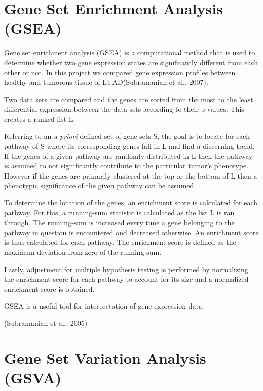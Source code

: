\documentclass[
  parskip,
  oneside]{scrreprt}
\begin{document}
\hypertarget{gene-set-enrichment-analysis-gsea}{%
\section{Gene Set Enrichment Analysis
(GSEA)}\label{gene-set-enrichment-analysis-gsea}}

Gene set enrichment analysis (GSEA) is a computational method that is
used to determine whether two gene expression states are significantly
different from each other or not. In this project we compared gene
expression profiles between healthy and tumorous tissue of
LUAD(Subramanian et al., 2007).

Two data sets are compared and the genes are sorted from the most to the
least differential expression between the data sets according to their
p-values. This creates a ranked list L.

Referring to an \emph{a priori} defined set of gene sets S, the goal is
to locate for each pathway of S where its corresponding genes fall in L
and find a discerning trend. If the genes of a given pathway are
randomly distributed in L then the pathway is assumed to not
significantly contribute to the particular tumor's phenotype. However if
the genes are primarily clustered at the top or the bottom of L then a
phenotypic significance of the given pathway can be assumed.

To determine the location of the genes, an enrichment score is
calculated for each pathway. For this, a running-sum statistic is
calculated as the list L is ran through. The running-sum is increased
every time a gene belonging to the pathway in question is encountered
and decreased otherwise. An enrichment score is thus calculated for each
pathway. The enrichment score is defined as the maximum deviation from
zero of the running-sum.

Lastly, adjustment for multiple hypothesis testing is performed by
normalizing the enrichment score for each pathway to account for its
size and a normalized enrichment score is obtained.

GSEA is a useful tool for interpretation of gene expression data.

(Subramanian et al., 2005)

\hypertarget{gene-set-variation-analysis-gsva}{%
\section{Gene Set Variation Analysis
(GSVA)}\label{gene-set-variation-analysis-gsva}}
\end{document}
